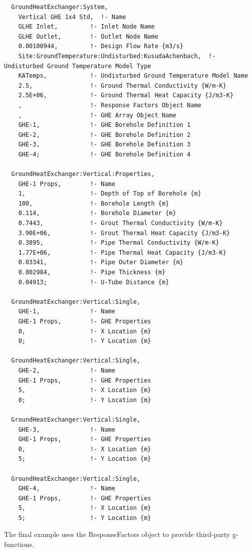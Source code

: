 \begin{lstlisting}
  GroundHeatExchanger:System,
    Vertical GHE 1x4 Std,  !- Name
    GLHE Inlet,         !- Inlet Node Name
    GLHE Outlet,        !- Outlet Node Name
    0.00100944,         !- Design Flow Rate {m3/s}
    Site:GroundTemperature:Undisturbed:KusudaAchenbach,  !- Undisturbed Ground Temperature Model Type
    KATemps,            !- Undisturbed Ground Temperature Model Name
    2.5,                !- Ground Thermal Conductivity {W/m-K}
    2.5E+06,            !- Ground Thermal Heat Capacity {J/m3-K}
    ,                   !- Response Factors Object Name
    ,                   !- GHE Array Object Name
    GHE-1,              !- GHE Borehole Definition 1
    GHE-2,              !- GHE Borehole Definition 2
    GHE-3,              !- GHE Borehole Definition 3
    GHE-4;              !- GHE Borehole Definition 4

  GroundHeatExchanger:Vertical:Properties,
    GHE-1 Props,        !- Name
    1,                  !- Depth of Top of Borehole {m}
    100,                !- Borehole Length {m}
    0.114,              !- Borehole Diameter {m}
    0.7443,             !- Grout Thermal Conductivity {W/m-K}
    3.90E+06,           !- Grout Thermal Heat Capacity {J/m3-K}
    0.3895,             !- Pipe Thermal Conductivity {W/m-K}
    1.77E+06,           !- Pipe Thermal Heat Capacity {J/m3-K}
    0.03341,            !- Pipe Outer Diameter {m}
    0.002984,           !- Pipe Thickness {m}
    0.04913;            !- U-Tube Distance {m}

  GroundHeatExchanger:Vertical:Single,
    GHE-1,              !- Name
    GHE-1 Props,        !- GHE Properties
    0,                  !- X Location {m}
    0;                  !- Y Location {m}

  GroundHeatExchanger:Vertical:Single,
    GHE-2,              !- Name
    GHE-1 Props,        !- GHE Properties
    5,                  !- X Location {m}
    0;                  !- Y Location {m}

  GroundHeatExchanger:Vertical:Single,
    GHE-3,              !- Name
    GHE-1 Props,        !- GHE Properties
    0,                  !- X Location {m}
    5;                  !- Y Location {m}

  GroundHeatExchanger:Vertical:Single,
    GHE-4,              !- Name
    GHE-1 Props,        !- GHE Properties
    5,                  !- X Location {m}
    5;                  !- Y Location {m}
\end{lstlisting}

The final example uses the ResponseFactors object to provide third-party g-functions.

